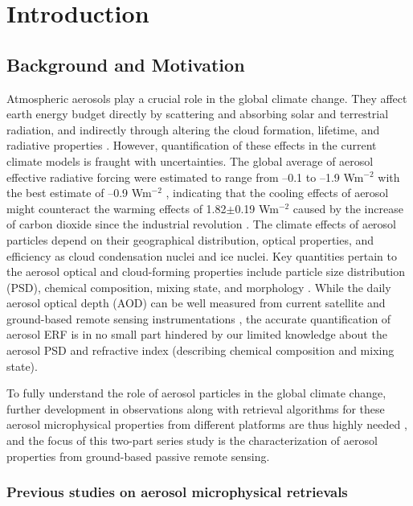 \chapter{Introduction}

\section{Background and Motivation}

Atmospheric aerosols play a crucial role in the global climate change. They
affect earth energy budget directly by scattering and absorbing solar and
terrestrial radiation, and indirectly through altering the cloud formation,
lifetime, and radiative properties \citep{Haywood00,Ramanathan01}.
However, quantification of these effects in the current climate
models is fraught with uncertainties. The global average of aerosol effective
radiative forcing were estimated to range from --0.1 to --1.9 Wm$^{-2}$ with the 
best estimate of --0.9 Wm$^{-2}$ \citep{Boucher13}, indicating that the cooling
effects of aerosol might counteract the warming effects of 1.82$\pm$0.19 Wm$^{-2}$
caused by the increase of carbon dioxide since the industrial revolution 
\citep{Myhre13}. The climate effects of aerosol particles depend on their
geographical distribution, optical properties, and efficiency as cloud
condensation nuclei and ice nuclei. 
Key quantities pertain to the aerosol optical and
cloud-forming properties include particle size distribution (PSD), chemical
composition, mixing state, and morphology \citep{Boucher13}. While the
daily aerosol optical depth (AOD) can be well measured from current satellite
and ground-based remote sensing instrumentations \citep[e.g.,][]{Holben98,Kaufman02},
the accurate quantification of aerosol ERF is in no
small part hindered by our limited knowledge about the aerosol PSD and
refractive index (describing chemical composition and mixing state). 

To fully understand the role of aerosol particles in the global climate change, 
further development in observations along with retrieval algorithms for these
aerosol microphysical properties from different platforms are thus highly
needed \citep{Mishchenko04}, and the focus of this two-part series study
is the characterization of aerosol properties from ground-based passive remote
sensing.

\subsection{Previous studies on aerosol microphysical retrievals}

